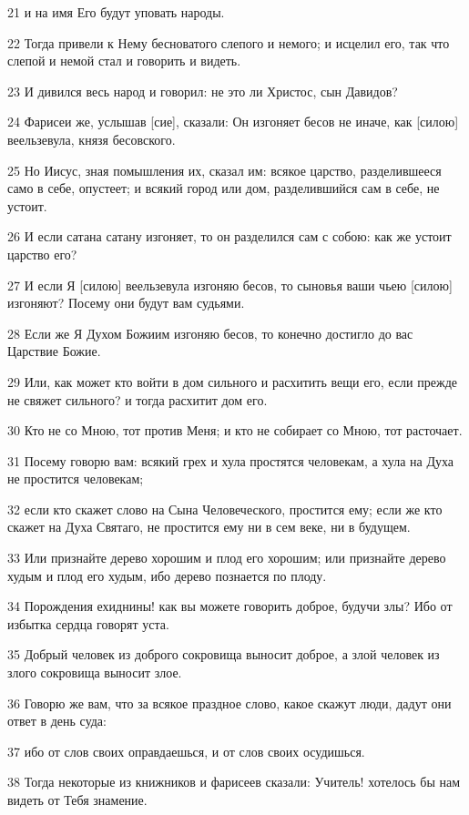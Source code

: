 \par 21 и на имя Его будут уповать народы.
\par 22 Тогда привели к Нему бесноватого слепого и немого; и исцелил его, так что слепой и немой стал и говорить и видеть.
\par 23 И дивился весь народ и говорил: не это ли Христос, сын Давидов?
\par 24 Фарисеи же, услышав [сие], сказали: Он изгоняет бесов не иначе, как [силою] веельзевула, князя бесовского.
\par 25 Но Иисус, зная помышления их, сказал им: всякое царство, разделившееся само в себе, опустеет; и всякий город или дом, разделившийся сам в себе, не устоит.
\par 26 И если сатана сатану изгоняет, то он разделился сам с собою: как же устоит царство его?
\par 27 И если Я [силою] веельзевула изгоняю бесов, то сыновья ваши чьею [силою] изгоняют? Посему они будут вам судьями.
\par 28 Если же Я Духом Божиим изгоняю бесов, то конечно достигло до вас Царствие Божие.
\par 29 Или, как может кто войти в дом сильного и расхитить вещи его, если прежде не свяжет сильного? и тогда расхитит дом его.
\par 30 Кто не со Мною, тот против Меня; и кто не собирает со Мною, тот расточает.
\par 31 Посему говорю вам: всякий грех и хула простятся человекам, а хула на Духа не простится человекам;
\par 32 если кто скажет слово на Сына Человеческого, простится ему; если же кто скажет на Духа Святаго, не простится ему ни в сем веке, ни в будущем.
\par 33 Или признайте дерево хорошим и плод его хорошим; или признайте дерево худым и плод его худым, ибо дерево познается по плоду.
\par 34 Порождения ехиднины! как вы можете говорить доброе, будучи злы? Ибо от избытка сердца говорят уста.
\par 35 Добрый человек из доброго сокровища выносит доброе, а злой человек из злого сокровища выносит злое.
\par 36 Говорю же вам, что за всякое праздное слово, какое скажут люди, дадут они ответ в день суда:
\par 37 ибо от слов своих оправдаешься, и от слов своих осудишься.
\par 38 Тогда некоторые из книжников и фарисеев сказали: Учитель! хотелось бы нам видеть от Тебя знамение.
